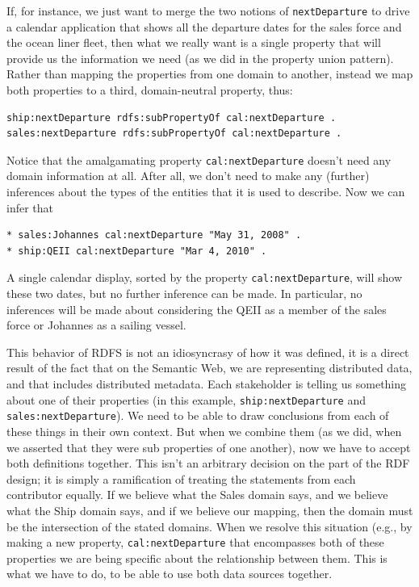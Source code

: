 If, for instance, we just want to merge the two notions of \texttt{nextDeparture}
to drive a calendar application that shows all the departure dates for
the sales force and the ocean liner fleet, then what we really want is a
single property that will provide us the information we need (as we did
in the property union pattern). Rather than mapping the properties from
one domain to another, instead we map both properties to a third,
domain-neutral property, thus:

\begin{lstlisting}
ship:nextDeparture rdfs:subPropertyOf cal:nextDeparture .
sales:nextDeparture rdfs:subPropertyOf cal:nextDeparture .
\end{lstlisting}

Notice that the amalgamating property \texttt{cal:nextDeparture} doesn't need any
domain information at all. After all, we don't need to make any
(further) inferences about the types of the entities that it is used to
describe. Now we can infer that

\begin{lstlisting}
* sales:Johannes cal:nextDeparture "May 31, 2008" .
* ship:QEII cal:nextDeparture "Mar 4, 2010" .
\end{lstlisting}

A single calendar display, sorted by the property \texttt{cal:nextDeparture},
will show these two dates, but no further inference can be made. In
particular, no inferences will be made about considering the QEII as a
member of the sales force or Johannes as a sailing vessel.

This behavior of RDFS is not an idiosyncrasy of how it was defined, it is
a direct result of the fact that on the Semantic Web, we are representing distributed
data, and that includes distributed metadata.  Each stakeholder is telling us 
something about one of their properties (in this example, \texttt{ship:nextDeparture} and
\texttt{sales:nextDeparture}).  We need to be able to draw conclusions from 
each of these things in their own context.  But when we combine them (as 
we did, when we asserted that they were sub properties of one another), now we 
have to accept both definitions together.  This isn't an arbitrary decision on 
the part of the RDF design; it is simply a ramification of treating the statements
from each contributor equally.  If we believe what the Sales domain says, and we believe
what the Ship domain says, and if we believe our mapping, then the domain must 
be the intersection of the stated domains.   When we resolve this situation (e.g., by
making a new property, \texttt{cal:nextDeparture} that encompasses both of these properties
we are being specific about the relationship between them.  This is what we have to
do, to be able to use both data sources together. 

